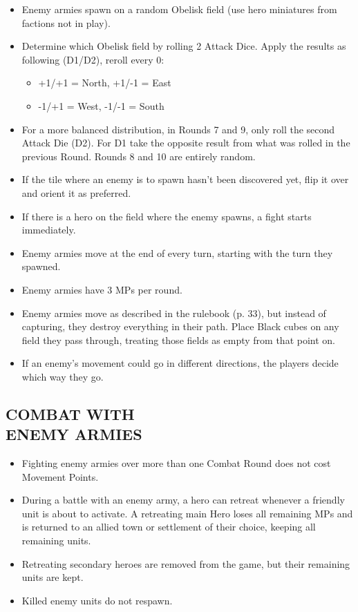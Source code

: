 \begin{multicols*}{2}
\begin{itemize}
  \item Enemy armies spawn on a random Obelisk field (use hero miniatures from factions not in play).
  \item Determine which Obelisk field by rolling 2 Attack Dice. Apply the results as following (D1/D2), reroll every 0:
  \begin{itemize}[leftmargin=15pt]
    \item +1/+1 = North, +1/-1 = East
    \item -1/+1 = West, -1/-1 = South
  \end{itemize}
  \item For a more balanced distribution, in Rounds 7 and 9, only roll the second Attack Die (D2). For D1 take the opposite result from what was rolled in the previous Round.
  Rounds 8 and 10 are entirely random.
  \item If the tile where an enemy is to spawn hasn't been discovered yet, flip it over and orient it as preferred.
  \item If there is a hero on the field where the enemy spawns, a fight starts immediately.
  \item Enemy armies move at the end of every turn, starting with the turn they spawned.
  \item Enemy armies have 3 MPs per round.
  \item Enemy armies move as described in the rulebook (p. 33), but instead of capturing, they destroy everything in their path.
    Place Black cubes on any field they pass through, treating those fields as empty from that point on.
  \item If an enemy's movement could go in different directions, the players decide which way they go.
\end{itemize}

\subsection*{\MakeUppercase{Combat with\\Enemy Armies}}

\begin{itemize}
  \item Fighting enemy armies over more than one Combat Round does not cost Movement Points.
  \item During a battle with an enemy army, a hero can retreat whenever a friendly unit is about to activate.
    A retreating main Hero loses all remaining MPs and is returned to an allied town or settlement of their choice, keeping all remaining units.
  \item Retreating secondary heroes are removed from the game, but their remaining units are kept.
  \item Killed enemy units do not respawn.
\end{itemize}


\end{multicols*}
